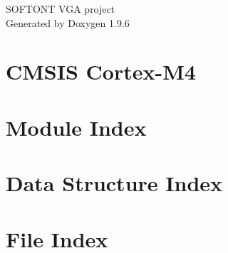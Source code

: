 \documentclass[twoside]{book}
\newcommand{\+}{\discretionary{\mbox{\scriptsize$\hookleftarrow$}}{}{}}
\newcommand{\clearemptydoublepage}{%
    \newpage{\pagestyle{empty}\cleardoublepage}%
  }
\begin{document}
  \raggedbottom
    \hypersetup{pageanchor=false,
                bookmarksnumbered=true,
                pdfencoding=unicode
               }
  \begin{titlepage}
  \vspace*{7cm}
  \begin{center}%
  {\Large SOFTONT VGA project}\\
  \vspace*{1cm}
  {\large Generated by Doxygen 1.9.6}\\
  \end{center}
  \end{titlepage}
  \clearemptydoublepage
  \tableofcontents
  \clearemptydoublepage
  \hypersetup{pageanchor=true}
\chapter{CMSIS Cortex-\/\+M4}
\label{index}\hypertarget{index}{}
\chapter{Module Index}

\chapter{Data Structure Index}

\chapter{File Index}

\end{document}
